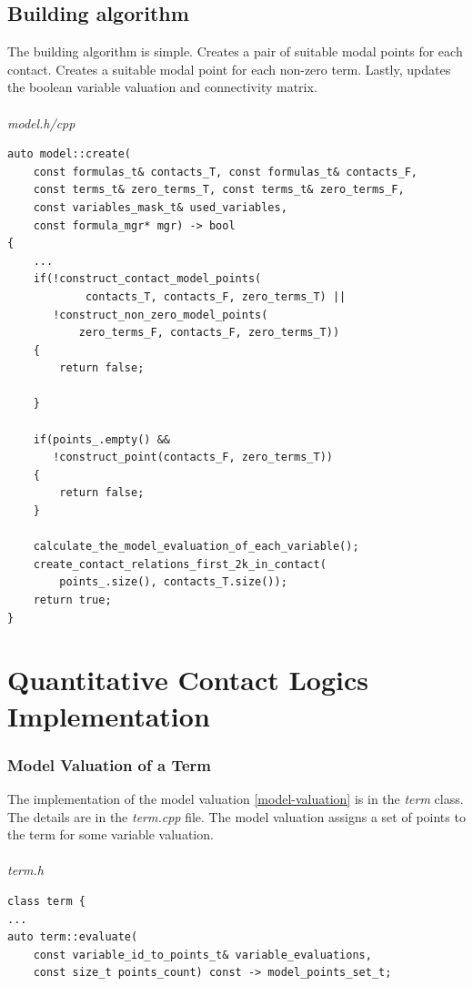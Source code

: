 \documentclass{article}
\begin{document}
	\subsection{Building algorithm}
	The building algorithm is simple. Creates a pair of suitable modal points for each contact. Creates a suitable modal point for each non-zero term. Lastly, updates the boolean variable valuation and connectivity matrix.
	\\
	\\
\noindent
\textit{model.h/cpp}
\begin{lstlisting}
auto model::create(
	const formulas_t& contacts_T, const formulas_t& contacts_F,
	const terms_t& zero_terms_T, const terms_t& zero_terms_F,
	const variables_mask_t& used_variables,
	const formula_mgr* mgr) -> bool
{
    ...
    if(!construct_contact_model_points(
            contacts_T, contacts_F, zero_terms_T) ||
       !construct_non_zero_model_points(
           zero_terms_F, contacts_F, zero_terms_T))
    {
        return false;

    }

    if(points_.empty() &&
       !construct_point(contacts_F, zero_terms_T))
    {
        return false;
    }

    calculate_the_model_evaluation_of_each_variable();
    create_contact_relations_first_2k_in_contact(
        points_.size(), contacts_T.size());
    return true;
}
\end{lstlisting}

	\newpage
	\section{Quantitative Contact Logics Implementation}
	\subsubsection*{Model Valuation of a Term}
	The implementation of the model valuation \ref{model-valuation} is in the \textit{term} class. The details are in the \textit{term.cpp} file.
	The model valuation assigns a set of points to the term for some variable valuation.
	\\
	\\
\noindent
\textit{term.h}
\begin{lstlisting}
class term {
...
auto term::evaluate(
	const variable_id_to_points_t& variable_evaluations,
	const size_t points_count) const -> model_points_set_t;
\end{lstlisting}	
\end{document}
